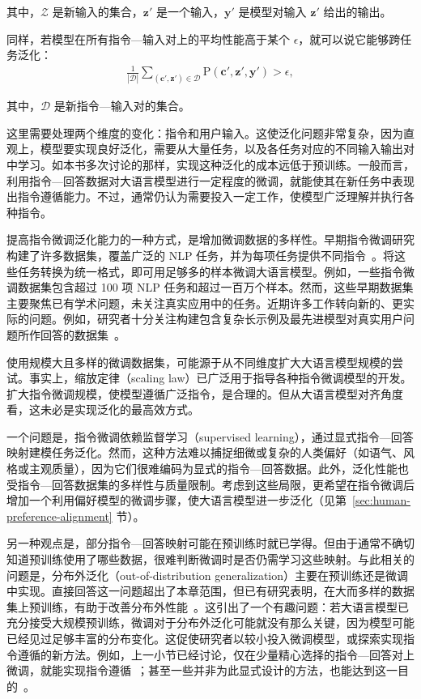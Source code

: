 \noindent 其中，$\mathcal{Z}$ 是新输入的集合，$\mathbf{z}'$ 是一个输入，$\mathbf{y}'$ 是模型对输入 $\mathbf{z}'$ 给出的输出。

同样，若模型在所有指令—输入对上的平均性能高于某个 $\epsilon$，就可以说它能够跨任务泛化：
\begin{eqnarray}
\frac{1}{|\mathcal{D}|} \sum_{(\mathbf{c}',\mathbf{z}') \in \mathcal{D}} \mathrm{P}(\mathbf{c}',\mathbf{z}',\mathbf{y}') > \epsilon,
\end{eqnarray}

\noindent 其中，$\mathcal{D}$ 是新指令—输入对的集合。


这里需要处理两个维度的变化：指令和用户输入。这使泛化问题非常复杂，因为直观上，模型要实现良好泛化，需要从大量任务，以及各任务对应的不同输入输出对中学习。如本书多次讨论的那样，实现这种泛化的成本远低于预训练。一般而言，利用指令—回答数据对大语言模型进行一定程度的微调，就能使其在新任务中表现出指令遵循能力。不过，通常仍认为需要投入一定工作，使模型广泛理解并执行各种指令。

提高指令微调泛化能力的一种方式，是增加微调数据的多样性。早期指令微调研究构建了许多数据集，覆盖广泛的 NLP 任务，并为每项任务提供不同指令~\cite{wang-etal:2022super,sanh-etal:2022multitask,longpre-etal:2023flan}。将这些任务转换为统一格式，即可用足够多的样本微调大语言模型。例如，一些指令微调数据集包含超过 100 项 NLP 任务和超过一百万个样本。然而，这些早期数据集主要聚焦已有学术问题，未关注真实应用中的任务。近期许多工作转向新的、更实际的问题。例如，研究者十分关注构建包含复杂长示例及最先进模型对真实用户问题所作回答的数据集~\cite{wang-etal:2023far,teknium:2023openhermes}。

使用规模大且多样的微调数据集，可能源于从不同维度扩大大语言模型规模的尝试。事实上，缩放定律（scaling law）已广泛用于指导各种指令微调模型的开发。扩大指令微调规模，使模型遵循广泛指令，是合理的。但从大语言模型对齐角度看，这未必是实现泛化的最高效方式。

一个问题是，指令微调依赖监督学习（supervised learning），通过显式指令—回答映射建模任务泛化。然而，这种方法难以捕捉细微或复杂的人类偏好（如语气、风格或主观质量），因为它们很难编码为显式的指令—回答数据。此外，泛化性能也受指令—回答数据集的多样性与质量限制。考虑到这些局限，更希望在指令微调后增加一个利用偏好模型的微调步骤，使大语言模型进一步泛化（见第~\ref{sec:human-preference-alignment} 节）。

另一种观点是，部分指令—回答映射可能在预训练时就已学得。但由于通常不确切知道预训练使用了哪些数据，很难判断微调时是否仍需学习这些映射。与此相关的问题是，分布外泛化（out-of-distribution generalization）主要在预训练还是微调中实现。直接回答这一问题超出了本章范围，但已有研究表明，在大而多样的数据集上预训练，有助于改善分布外性能~\cite{hendrycks-etal:2020pretrained,radford-etal:2021learning,gunasekar-etal:2023textbooks}。这引出了一个有趣问题：若大语言模型已充分接受大规模预训练，微调对于分布外泛化可能就没有那么关键，因为模型可能已经见过足够丰富的分布变化。这促使研究者以较小投入微调模型，或探索实现指令遵循的新方法。例如，上一小节已经讨论，仅在少量精心选择的指令—回答对上微调，就能实现指令遵循~\cite{zhou-etal:2023lima}；甚至一些并非为此显式设计的方法，也能达到这一目的~\cite{kung-and-peng:2023models}。

